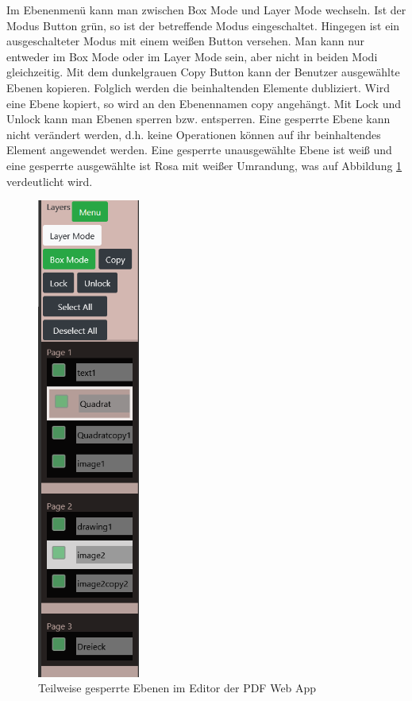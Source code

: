 Im Ebenenmenü kann man zwischen Box Mode und Layer Mode wechseln. Ist der Modus Button grün, so ist der betreffende Modus eingeschaltet. Hingegen ist ein ausgeschalteter Modus mit einem weißen Button versehen. Man kann nur entweder im Box Mode oder im Layer Mode sein, aber nicht in beiden Modi gleichzeitig. Mit dem dunkelgrauen Copy Button kann der Benutzer ausgewählte Ebenen kopieren. Folglich werden die beinhaltenden Elemente dubliziert. Wird eine Ebene kopiert, so wird an den Ebenennamen copy angehängt. Mit Lock und Unlock kann man Ebenen sperren bzw. entsperren. Eine gesperrte Ebene kann nicht verändert werden, d.h. keine Operationen können auf ihr beinhaltendes Element angewendet werden. Eine gesperrte unausgewählte Ebene ist weiß und eine gesperrte ausgewählte ist Rosa mit weißer Umrandung, was auf Abbildung \ref{fig:ebenen2} verdeutlicht wird. 

\begin{figure}[!htbp]
	\centering
	\includegraphics[width=0.3\textwidth]{"images/ebenen2.png"}
	\caption{Teilweise gesperrte Ebenen im Editor der PDF Web App}
	\label{fig:ebenen2}
\end{figure}

